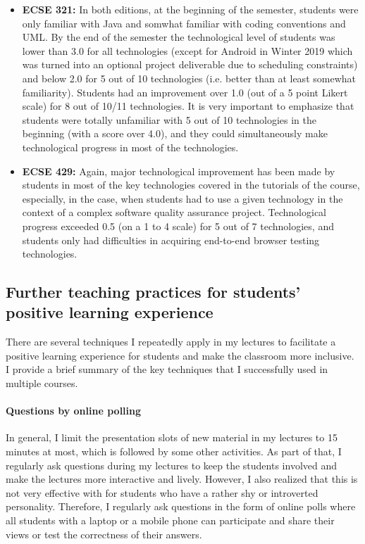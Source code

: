 \begin{itemize}[leftmargin=0.5cm]
\item \textbf{ECSE 321:} In both editions, at the beginning of the semester, students were only familiar with Java and 
somwhat familiar with coding conventions and UML. By the end of the semester the technological level of students was 
lower than 3.0 for all technologies (except for Android in Winter 2019 which was turned into an optional project deliverable 
due to scheduling constraints) and below 2.0 for 5 out of 10 technologies (i.e. better than at least somewhat familiarity). 
Students had an improvement over 1.0 (out of a 5 point Likert scale) for 8 out of 10/11 technologies. It is very important to 
emphasize that students were totally unfamiliar with 5 out of 10 technologies in the beginning (with a score over 4.0), and 
they could simultaneously make technological progress in most of the technologies. 

\item \textbf{ECSE 429:} Again, major technological improvement has been made by students in most of the key 
technologies covered in the tutorials of the course, especially, in the case, when students had to use a given technology in 
the context of a complex software quality assurance project. Technological progress exceeded 0.5 (on a 1 to 4 scale) for 5 
out of 7 technologies, and students only had difficulties in acquiring end-to-end browser testing technologies.
\end{itemize}

\subsection{Further teaching practices for students' positive learning experience}

There are several techniques I repeatedly apply in my lectures to facilitate a positive learning experience for students and 
make the classroom more inclusive. I provide a brief summary of the key techniques that I successfully used in multiple 
courses. 

\paragraph{Questions by online polling}
In general, I limit the presentation slots of new material in my lectures to 15 minutes at most, which is followed by some 
other activities. As part of that, I regularly ask questions during my lectures to keep the students involved and make the 
lectures more interactive and lively. However, I also realized that this is not very effective with for students who have a 
rather shy or introverted personality. Therefore, I regularly ask questions in the form of online polls where all students with 
a laptop or a mobile phone can participate and share their views or test the correctness of their answers. 

